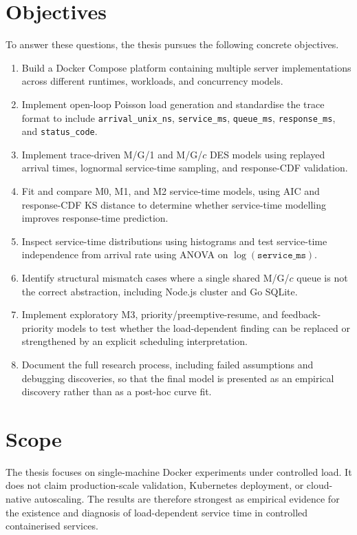 \section{Objectives}

To answer these questions, the thesis pursues the following concrete objectives.

\begin{enumerate}
    \item Build a Docker Compose platform containing multiple server implementations across different runtimes, workloads, and concurrency models.
    \item Implement open-loop Poisson load generation and standardise the trace format to include \texttt{arrival\_unix\_ns}, \texttt{service\_ms}, \texttt{queue\_ms}, \texttt{response\_ms}, and \texttt{status\_code}.
    \item Implement trace-driven M/G/1 and M/G/$c$ DES models using replayed arrival times, lognormal service-time sampling, and response-CDF validation.
    \item Fit and compare M0, M1, and M2 service-time models, using AIC and response-CDF KS distance to determine whether service-time modelling improves response-time prediction.
    \item Inspect service-time distributions using histograms and test service-time independence from arrival rate using ANOVA on $\log(\texttt{service\_ms})$.
    \item Identify structural mismatch cases where a single shared M/G/$c$ queue is not the correct abstraction, including Node.js cluster and Go SQLite.
    \item Implement exploratory M3, priority/preemptive-resume, and feedback-priority models to test whether the load-dependent finding can be replaced or strengthened by an explicit scheduling interpretation.
    \item Document the full research process, including failed assumptions and debugging discoveries, so that the final model is presented as an empirical discovery rather than as a post-hoc curve fit.
\end{enumerate}

\section{Scope}

The thesis focuses on single-machine Docker experiments under controlled load. It does not claim production-scale validation, Kubernetes deployment, or cloud-native autoscaling. The results are therefore strongest as empirical evidence for the existence and diagnosis of load-dependent service time in controlled containerised services.

